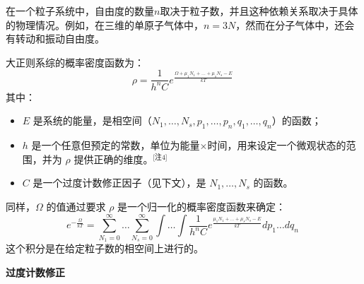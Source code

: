在一个粒子系统中，自由度的数量\( n \)取决于粒子数，并且这种依赖关系取决于具体的物理情况。例如，在三维的单原子气体中，\( n = 3N \)，然而在分子气体中，还会有转动和振动自由度。

大正则系综的概率密度函数为：
\[
\rho = \frac{1}{h^n C} e^{\frac{\Omega + \mu_1 N_1 + \dots + \mu_s N_s - E}{kT}}~
\]
其中：
\begin{itemize}
\item \( E \) 是系统的能量，是相空间（\( N_1, \dots, N_s, p_1, \dots, p_n, q_1, \dots, q_n \)）的函数；
\item \( h \) 是一个任意但预定的常数，单位为能量×时间，用来设定一个微观状态的范围，并为 \( \rho \) 提供正确的维度。\(^\text{[注4]}\)
\item \( C \) 是一个过度计数修正因子（见下文），是 \( N_1, \dots, N_s \) 的函数。
\end{itemize}
同样，\( \Omega \) 的值通过要求 \( \rho \) 是一个归一化的概率密度函数来确定：
\[
e^{-\frac{\Omega}{kT}} = \sum_{N_1=0}^{\infty} \dots \sum_{N_s=0}^{\infty} \int \dots \int \frac{1}{h^n C} e^{\frac{\mu_1 N_1 + \dots + \mu_s N_s - E}{kT}} dp_1 \dots dq_n~
\]
这个积分是在给定粒子数的相空间上进行的。

\textbf{过度计数修正} 
 
 
